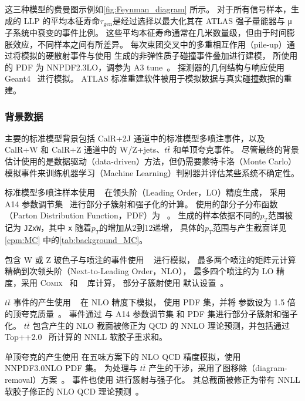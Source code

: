 这三种模型的费曼图示例如\autoref{fig:Feynman_diagram} 所示。
对于所有信号样本，生成的 LLP 的平均本征寿命$\tau_{\text{gen}}$是经过选择以最大化其在 ATLAS 强子量能器与 μ 子系统中衰变的事件比例。
这些平均本征寿命通常在几米数量级，但由于时间膨胀效应，不同样本之间有所差异。
每次束团交叉中的多重相互作用（pile-up）通过将模拟的硬散射事件与使用  生成的非弹性质子碰撞事件叠加进行建模，
所使用的 PDF 为 NNPDF2.3LO，调参为 A3 tune~\cite{ATL-PHYS-PUB-2016-017}。
探测器的几何结构与响应使用 Geant4~\cite{GEANT4:2002zbu} 进行模拟。
ATLAS 标准重建软件被用于模拟数据与真实碰撞数据的重建。

\subsubsection{背景数据}
主要的标准模型背景包括 CalR+2J 通道中的标准模型多喷注事件，以及 CalR+W 和 CalR+Z 通道中的 W/Z+jets、$t\bar{t}$ 和单顶夸克事件。
尽管最终的背景估计使用的是数据驱动（data-driven）方法，但仍需要蒙特卡洛（Monte Carlo）模拟事件来训练机器学习（Machine Learning）判别器并评估某些系统不确定性。

标准模型多喷注样本使用 ~\cite{pythia} 在领头阶（Leading Order，LO）精度生成，
采用 A14 参数调节集~\cite{Pythia_tunes} 进行部分子簇射和强子化的计算。
使用的部分子分布函数（Parton Distribution Function，PDF）为 \NNPDF[2.3lo]~\cite{parton_PDF}。
生成的样本依据不同的$p_T$范围被记为 \texttt{JZxW}，其中 \texttt{x} 随着$p_T$的增加从2到12递增，
具体的$p_T$范围与产生截面详见\autoref{cpm:MC} 中的\autoref{tab:background_MC}。

包含 W 或 Z 玻色子与喷注的事件使用 \Sherpa[v2.2.1]~\cite{Sherpa} 进行模拟，
最多两个喷注的矩阵元计算精确到次领头阶（Next-to-Leading Order，NLO），
最多四个喷注的为 LO 精度，采用 \textsc{Comix}~\cite{Comix} 和 \OPENLOOPS~\cite{Open_Loops} 库计算，
部分子簇射使用 \Sherpa 默认设置~\cite{parton_shower}。

$t\bar{t}$ 事件的产生使用 \POWHEGBOX[v2]~\cite{POWHEG_BOX} 在 NLO 精度下模拟，
使用 \NNPDF[3.0NLO] PDF 集，并将 \hdamp 参数设为 1.5 倍的顶夸克质量~\cite{ATL-PHYS-PUB-2016-020}。
事件通过 \Pythia[8.230] 与 A14 参数调节集 和 \NNPDF[2.3LO] PDF 集进行部分子簇射和强子化。
$t\bar{t}$ 包含产生的 NLO 截面被修正为 QCD 的 NNLO 理论预测，并包括通过 Top++2.0~\cite{Beneke:2011mq} 所计算的 NNLL 软胶子重求和。

单顶夸克的产生使用 \POWHEGBOX[v2] 在五味方案下的 NLO QCD 精度模拟，使用 NNPDF3.0NLO PDF 集。
为处理与 $t\bar{t}$ 产生的干涉，采用了图移除（diagram-removal）方案~\cite{Frixione:2008yi}。
事件也使用  进行簇射与强子化。
其总截面被修正为带有 NNLL 软胶子修正的 NLO QCD 理论预测~\cite{Aliev:2010zk}。


